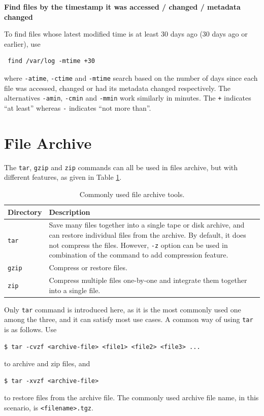 \vspace{0.1in}
\noindent \textbf{Find files by the timestamp it was accessed / changed / metadata changed}
\vspace{0.1in}

To find files whose latest modified time is at least 30 days ago (30 days ago or earlier), use
\begin{lstlisting}
 find /var/log -mtime +30
\end{lstlisting}
where \verb|-atime|, \verb|-ctime| and \verb|-mtime| search based on the number of days since each file was accessed, changed or had its metadata changed respectively. The alternatives \verb|-amin|, \verb|-cmin| and \verb|-mmin| work similarly in minutes. The \verb|+| indicates ``at least'' whereas \verb|-| indicates ``not more than''.

\section{File Archive}

The \verb|tar|, \verb|gzip| and \verb|zip| commands can all be used in files archive, but with different features, as given in Table \ref{ch:fm:tab:filearchivetools}.

\begin{table}[!htb]
	\centering \caption{Commonly used file archive tools.}\label{ch:fm:tab:filearchivetools}
	\begin{tabularx}{\textwidth}{lX}
		\hline
		Directory & Description \\ \hline
		\verb|tar| & Save many files together into a single tape or disk archive, and can
		restore individual files from the archive. By default, it does not compress the files. However, \verb|-z| option can be used in combination of the command to add compression feature. \\ 
		\verb|gzip| & Compress or restore files. \\ 
		\verb|zip| & Compress multiple files one-by-one and integrate them together into a single file. \\
		\hline
	\end{tabularx}
\end{table}

Only \verb|tar| command is introduced here, as it is the most commonly used one among the three, and it can satisfy most use cases. A common way of using \verb|tar| is as follows. Use
\begin{lstlisting}
$ tar -cvzf <archive-file> <file1> <file2> <file3> ...
\end{lstlisting}
to archive and zip files, and
\begin{lstlisting}
$ tar -xvzf <archive-file>
\end{lstlisting}
to restore files from the archive file. The commonly used archive file name, in this scenario, is \verb|<filename>.tgz|.

